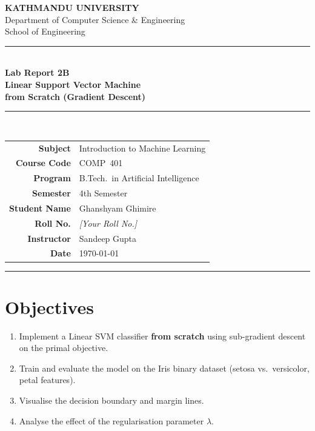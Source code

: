 \documentclass[12pt,a4paper]{article}
\begin{document}
\begin{center}
  {\Large\bfseries\color{kuBlue} KATHMANDU UNIVERSITY}\\[4pt]
  {\normalsize Department of Computer Science \& Engineering}\\[2pt]
  {\normalsize School of Engineering}\\[10pt]
  \rule{\linewidth}{1.5pt}\\[6pt]
  {\large\bfseries Lab Report 2B}\\[4pt]
  {\LARGE\bfseries Linear Support Vector Machine\\[4pt]from Scratch (Gradient Descent)}\\[4pt]
  \rule{\linewidth}{0.8pt}\\[10pt]
\end{center}

\begin{center}
\renewcommand{\arraystretch}{1.4}
\begin{tabular}{r l}
  \textbf{Subject}      & Introduction to Machine Learning \\
  \textbf{Course Code}  & COMP~401 \\
  \textbf{Program}      & B.Tech.\ in Artificial Intelligence \\
  \textbf{Semester}     & 4th Semester \\
  \textbf{Student Name} & Ghanshyam Ghimire \\
  \textbf{Roll No.}     & \textit{[Your Roll No.]} \\
  \textbf{Instructor}   & Sandeep Gupta \\
  \textbf{Date}         & \today \\
\end{tabular}
\end{center}
\vspace{10pt}\hrule\vspace{16pt}

\section{Objectives}
\begin{enumerate}[label=\arabic*.]
  \item Implement a Linear SVM classifier \textbf{from scratch} using sub-gradient descent on the primal objective.
  \item Train and evaluate the model on the Iris binary dataset (setosa vs.\ versicolor, petal features).
  \item Visualise the decision boundary and margin lines.
  \item Analyse the effect of the regularisation parameter $\lambda$.
\end{enumerate}
\end{document}
